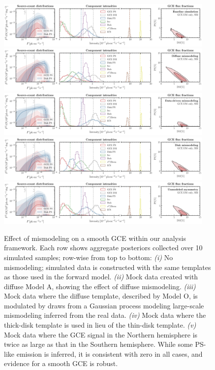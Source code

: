 \documentclass[prd,aps,10pt,nofootinbib,twocolumn,superscriptaddress,preprintnumbers,balancelastpage,longbibliography]{revtex4-1}
\begin{document}
%
\begin{figure}
\centering
\includegraphics[width=0.95\textwidth]{plots/sim_sbi_dm_agg.pdf}
\includegraphics[width=0.95\textwidth]{plots/sim_sbi_modelA_dm.pdf}
\includegraphics[width=0.95\textwidth]{plots/sim_sbi_dm_mismo.pdf}
\includegraphics[width=0.95\textwidth]{plots/sim_sbi_thick_disk_mm_dm.pdf}
\includegraphics[width=0.95\textwidth]{plots/sim_sbi_dm_asym.pdf}
\caption{Effect of mismodeling on a smooth GCE within our analysis framework. Each row shows aggregate posteriors collected over 10 simulated samples; row-wise from top to bottom: \emph{(i)} No mismodeling; simulated data is constructed with the same templates as those used in the forward model. \emph{(ii)} Mock data created with diffuse Model A, showing the effect of diffuse mismodeling. \emph{(iii)} Mock data where the diffuse template, described by Model O, is modulated by draws from a Gaussian process modeling large-scale mismodeling inferred from the real \Fermi data. \emph{(iv)} Mock data where the thick-disk template is used in lieu of the thin-disk template. \emph{(v)} Mock data where the GCE signal in the Northern hemisphere is twice as large as that in the Southern hemisphere. While some PS-like emission is inferred, it is consistent with zero in all cases, and evidence for a smooth GCE is robust.}
\label{fig:sim_sbi_mismo}
\end{figure}
%
\end{document}
